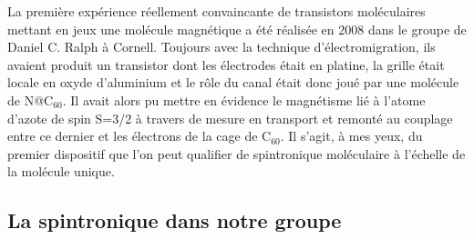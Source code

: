 La première expérience réellement convaincante de transistors moléculaires mettant en jeux une molécule magnétique a été réalisée en 2008 dans le groupe de Daniel C. Ralph à Cornell. Toujours avec la technique d'électromigration, ils avaient produit un transistor dont les électrodes était en platine, la grille était locale en oxyde d'aluminium et le rôle du canal était donc joué par une molécule de N@C$_{60}$. Il avait alors pu mettre en évidence le magnétisme lié à l'atome d'azote de spin S=3/2 à travers de mesure en transport et remonté au couplage entre ce dernier et les électrons de la cage de C$_{60}$. Il s'agit, à mes yeux, du premier dispositif que l'on peut qualifier de spintronique moléculaire à l'échelle de la molécule unique.
 
\subsection{La spintronique dans notre groupe}